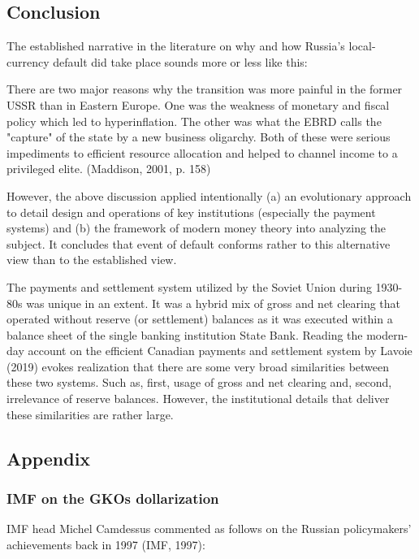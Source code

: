 \subsection{Conclusion}

The established narrative in the literature on why and how Russia's local-currency default did take place sounds more or less like this: 

There are two major reasons why the transition was more painful in the former USSR than in Eastern Europe. One was the weakness of monetary and fiscal policy which led to hyperinflation. The other was what the EBRD calls the "capture" of the state by a new business oligarchy. Both of these were serious impediments to efficient resource allocation and helped to channel income to a privileged elite. 
(Maddison, 2001, p. 158)

However, the above discussion applied intentionally (a) an evolutionary approach to detail design and operations of key institutions (especially the payment systems) and (b) the framework of modern money theory into analyzing the subject. It concludes that event of default conforms rather to this alternative view than to the established view. 

The payments and settlement system utilized by the Soviet Union during 1930-80s was unique in an extent. It was a hybrid mix of gross and net clearing that operated without reserve (or settlement) balances as it was executed within a balance sheet of the single banking institution State Bank. Reading the modern-day account on the efficient Canadian payments and settlement system by Lavoie (2019) evokes realization that there are some very broad similarities between these two systems. Such as, first, usage of gross and net clearing and, second, irrelevance of reserve balances. However, the institutional details that deliver these similarities are rather large. 

\subsection{Appendix}

\subsubsection{IMF on the GKOs dollarization}

IMF head Michel Camdessus commented as follows on the Russian policymakers' achievements back in 1997 (IMF, 1997):

